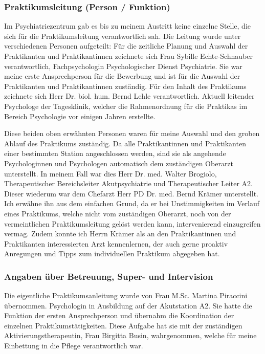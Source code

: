 \subsubsection{Praktikumsleitung (Person / Funktion)}
Im Psychiatriezentrum gab es bis zu meinem Austritt keine einzelne Stelle, die sich für die Praktikumsleitung verantwortlich sah. Die Leitung wurde unter verschiedenen Personen aufgeteilt: Für die zeitliche Planung und Auswahl der Praktikanten und Praktikantinnen zeichnete sich Frau Sybille Echte-Schnauber verantwortlich, Fachpsychologin Psychologischer Dienst Psychiatrie. Sie war meine erste Ansprechperson für die Bewerbung und ist für die Auswahl der Praktikanten und Praktikantinnen zuständig. Für den Inhalt des Praktikums zeichnete sich Herr Dr. biol. hum. Bernd Lehle verantwortlich. Aktuell leitender Psychologe der Tagesklinik, welcher die Rahmenordnung für die Praktikas im Bereich Psychologie vor einigen Jahren erstellte. 

Diese beiden oben erwähnten Personen waren für meine Auswahl und den groben Ablauf des Praktikums zuständig. Da alle Praktikantinnen und Praktikanten einer bestimmten Station angeschlossen werden, sind sie als angehende Psychologinnen und Psychologen automatisch dem zuständigen Oberarzt unterstellt. In meinem Fall war dies Herr Dr. med. Walter Brogiolo, Therapeutischer Bereichsleiter Akutpsychiatrie und Therapeutischer Leiter A2. Dieser wiederum war dem Chefarzt Herr PD Dr. med. Bernd Krämer unterstellt. Ich erwähne ihn aus dem einfachen Grund, da er bei Unstimmigkeiten im Verlauf eines Praktikums, welche nicht vom zuständigen Oberarzt, noch von der vermeintlichen Praktikumsleitung gelöst werden kann, intervenierend einzugreifen vermag. Zudem konnte ich Herrn Krämer als an den Praktikantinnen und Praktikanten interessierten Arzt kennenlernen, der auch gerne proaktiv Anregungen und Tipps zum individuellen Praktikum abgegeben hat.

\subsubsection{Angaben über Betreuung, Super- und Intervision}
Die eigentliche Praktikumsanleitung wurde von Frau M.Sc. Martina Piraccini übernommen. Psychologin in Ausbildung auf der Akutstation A2. Sie hatte die Funktion der ersten Ansprechperson und übernahm die Koordination der einzelnen Praktikumstätigkeiten. Diese Aufgabe hat sie mit der zuständigen Aktivierungstherapeutin, Frau Birgitta Busin, wahrgenommen, welche für meine Einbettung in die Pflege verantwortlich war. 

